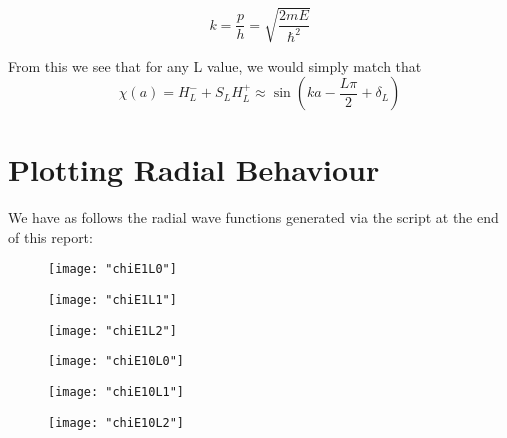 \documentclass[11pt]{article} %
\begin{document}
\begin{equation}
k=\frac{p}{h}=\sqrt{\frac{2mE}{\hbar^2}}
\end{equation}

From this we see that for any L value, we would simply match that\\

\begin{equation}
\chi(a)=H_L^-+S_LH_L^+\approx \sin(ka-\frac{L\pi}{2}+\delta_L)
\end{equation}

\section{Plotting Radial Behaviour}

We have as follows the radial wave functions generated via the script at the end of this report:\\


\vspace{1mm}
\begin{figure}[h]
\centering
\texttt{[image: "chiE1L0"]}
\end{figure}
\vspace{1mm}


\vspace{1mm}
\begin{figure}[h]
\centering
\texttt{[image: "chiE1L1"]}
\end{figure}
\vspace{1mm}


\vspace{1mm}
\begin{figure}[h]
\centering
\texttt{[image: "chiE1L2"]}
\end{figure}
\vspace{1mm}


\vspace{1mm}
\begin{figure}[h]
\centering
\texttt{[image: "chiE10L0"]}
\end{figure}
\vspace{1mm}


\vspace{1mm}
\begin{figure}[h]
\centering
\texttt{[image: "chiE10L1"]}
\end{figure}
\vspace{1mm}


\vspace{1mm}
\begin{figure}[h]
\centering
\texttt{[image: "chiE10L2"]}
\end{figure}
\vspace{1mm}
\end{document}

